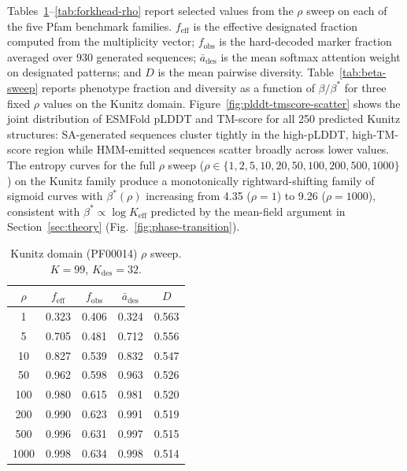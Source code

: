 Tables~\ref{tab:kunitz-rho}--\ref{tab:forkhead-rho} report selected values from
the $\rho$ sweep on each of the five Pfam benchmark families.
$f_{\mathrm{eff}}$ is the effective designated fraction computed from the
multiplicity vector; $f_{\mathrm{obs}}$ is the hard-decoded marker fraction
averaged over 930 generated sequences; $\bar{a}_{\mathrm{des}}$ is the mean
softmax attention weight on designated patterns; and $D$ is the mean pairwise
diversity. Table~\ref{tab:beta-sweep} reports phenotype fraction and
diversity as a function of $\beta/\beta^{*}$ for three fixed $\rho$ values
on the Kunitz domain. Figure~\ref{fig:plddt-tmscore-scatter} shows the joint
distribution of ESMFold pLDDT and TM-score for all 250 predicted Kunitz
structures: SA-generated sequences cluster tightly in the high-pLDDT,
high-TM-score region while HMM-emitted sequences scatter broadly across
lower values. The entropy curves for the full $\rho$ sweep
($\rho \in \{1, 2, 5, 10, 20, 50, 100, 200, 500, 1000\}$) on the Kunitz
family produce a monotonically rightward-shifting family of sigmoid curves
with $\beta^{*}(\rho)$ increasing from 4.35 ($\rho=1$) to 9.26
($\rho=1000$), consistent with $\beta^{*} \propto \log K_{\mathrm{eff}}$
predicted by the mean-field argument in Section~\ref{sec:theory}
(Fig.~\ref{fig:phase-transition}).

\begin{table}[ht]
  \centering
  \caption{Kunitz domain (PF00014) $\rho$ sweep. $K=99$, $K_{\mathrm{des}}=32$.}
  \label{tab:kunitz-rho}
  \small
  \begin{tabular}{ccccc}
    \toprule
    $\rho$ & $f_{\mathrm{eff}}$ & $f_{\mathrm{obs}}$ & $\bar{a}_{\mathrm{des}}$ & $D$ \\
    \midrule
    1    & 0.323 & 0.406 & 0.324 & 0.563 \\
    5    & 0.705 & 0.481 & 0.712 & 0.556 \\
    10   & 0.827 & 0.539 & 0.832 & 0.547 \\
    50   & 0.962 & 0.598 & 0.963 & 0.526 \\
    100  & 0.980 & 0.615 & 0.981 & 0.520 \\
    200  & 0.990 & 0.623 & 0.991 & 0.519 \\
    500  & 0.996 & 0.631 & 0.997 & 0.515 \\
    1000 & 0.998 & 0.634 & 0.998 & 0.514 \\
    \bottomrule
  \end{tabular}
\end{table}

